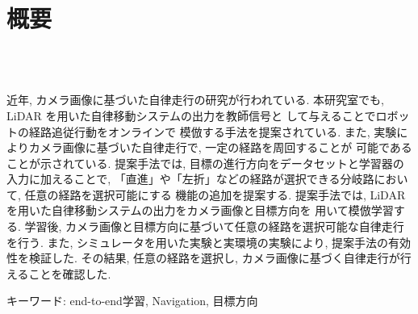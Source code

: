 \chapter*{概要}
\thispagestyle{empty}
%
\begin{center}
  \scalebox{1.5}{視覚と行動のend-to-end学習により}\\
  \scalebox{1.5}{経路追従行動をオンラインで模倣する手法の提案}\\
  \scalebox{1.5}{（目標方向による経路選択機能の追加と検証）}
\end{center}
\vspace{1.0zh}
%
近年, カメラ画像に基づいた自律走行の研究が行われている. 本研究室でも, LiDAR
を用いた自律移動システムの出力を教師信号と
して与えることでロボットの経路追従行動をオンラインで
模倣する手法を提案されている. また, 実験によりカメラ画像に基づいた自律走行で, 一定の経路を周回することが
可能であることが示されている. 提案手法では, 目標の進行方向をデータセットと学習器の入力に加えることで, 
「直進」や「左折」などの経路が選択できる分岐路において, 任意の経路を選択可能にする
機能の追加を提案する. 提案手法では, LiDARを用いた自律移動システムの出力をカメラ画像と目標方向を
用いて模倣学習する. 学習後, カメラ画像と目標方向に基づいて任意の経路を選択可能な自律走行を行う. 
また, シミュレータを用いた実験と実環境の実験により, 提案手法の有効性を検証した. 
その結果, 任意の経路を選択し, カメラ画像に基づく自律走行が行えることを確認した.

キーワード: end-to-end学習, Navigation, 目標方向
%
\newpage
